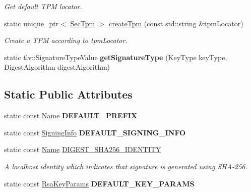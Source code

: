 \begin{DoxyCompactItemize}
\begin{DoxyCompactList}\small\item\em Get default T\+PM locator. \end{DoxyCompactList}\item 
static unique\+\_\+ptr$<$ \hyperlink{classndn_1_1SecTpm}{Sec\+Tpm} $>$ \hyperlink{classndn_1_1security_1_1KeyChain_abc6b4896099a73d4588a99c5f3cde9b1}{create\+Tpm} (const std\+::string \&tpm\+Locator)\hypertarget{classndn_1_1security_1_1KeyChain_abc6b4896099a73d4588a99c5f3cde9b1}{}\label{classndn_1_1security_1_1KeyChain_abc6b4896099a73d4588a99c5f3cde9b1}

\begin{DoxyCompactList}\small\item\em Create a T\+PM according to {\ttfamily tpm\+Locator}. \end{DoxyCompactList}\item 
static tlv\+::\+Signature\+Type\+Value {\bfseries get\+Signature\+Type} (Key\+Type key\+Type, Digest\+Algorithm digest\+Algorithm)\hypertarget{classndn_1_1security_1_1KeyChain_a3c3fccba48db4350a0e48b8cae898944}{}\label{classndn_1_1security_1_1KeyChain_a3c3fccba48db4350a0e48b8cae898944}

\end{DoxyCompactItemize}
\subsection*{Static Public Attributes}
\begin{DoxyCompactItemize}
\item 
static const \hyperlink{classndn_1_1Name}{Name} {\bfseries D\+E\+F\+A\+U\+L\+T\+\_\+\+P\+R\+E\+F\+IX}\hypertarget{classndn_1_1security_1_1KeyChain_a6f8aa6093d23387892cf1673a5645eae}{}\label{classndn_1_1security_1_1KeyChain_a6f8aa6093d23387892cf1673a5645eae}

\item 
static const \hyperlink{classndn_1_1security_1_1SigningInfo}{Signing\+Info} {\bfseries D\+E\+F\+A\+U\+L\+T\+\_\+\+S\+I\+G\+N\+I\+N\+G\+\_\+\+I\+N\+FO}\hypertarget{classndn_1_1security_1_1KeyChain_aff9b4c0570c4e04e1af73895cbc818c3}{}\label{classndn_1_1security_1_1KeyChain_aff9b4c0570c4e04e1af73895cbc818c3}

\item 
static const \hyperlink{classndn_1_1Name}{Name} \hyperlink{classndn_1_1security_1_1KeyChain_adf4f8fd3353671ac77f02b94530620b1}{D\+I\+G\+E\+S\+T\+\_\+\+S\+H\+A256\+\_\+\+I\+D\+E\+N\+T\+I\+TY}
\begin{DoxyCompactList}\small\item\em A localhost identity which indicates that signature is generated using S\+H\+A-\/256. \end{DoxyCompactList}\item 
static const \hyperlink{namespacendn_ae610775b86cefd44fb0d9b171861c964}{Rsa\+Key\+Params} {\bfseries D\+E\+F\+A\+U\+L\+T\+\_\+\+K\+E\+Y\+\_\+\+P\+A\+R\+A\+MS}\hypertarget{classndn_1_1security_1_1KeyChain_a17e94be3622f3af0a8676ae38a959889}{}\label{classndn_1_1security_1_1KeyChain_a17e94be3622f3af0a8676ae38a959889}

\end{DoxyCompactItemize}


